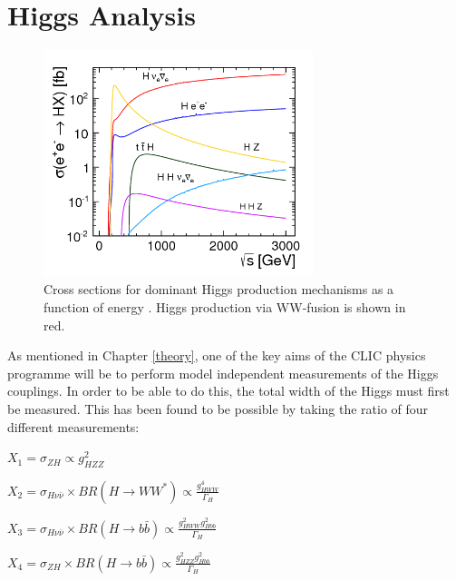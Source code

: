 \chapter{Higgs Analysis}
\label{Higgs Analysis}

\begin{figure}
  \centering
  \includegraphics[width=0.7\textwidth,keepaspectratio]{Theory/fig/HiggsCrossSections}
  \caption[Cross Sections For Higgs Production Mechanisms]{Cross sections for dominant Higgs production mechanisms as a function of energy \cite{Abramowicz:2016zbo}. Higgs production via WW-fusion is shown in red.}
  \label{fig:higgsXSecs2}
\end{figure}

As mentioned in Chapter \ref{theory}, one of the key aims of the \ac{CLIC} physics programme will be to perform model independent measurements of the Higgs couplings. In order to be able to do this, the total width of the Higgs must first be measured. This has been found to be possible by taking the ratio of four different measurements:


\hspace{120pt}  $X_1=\sigma_{ZH} \propto g_{HZZ}^2$

\hspace{120pt}   $X_2=\sigma_{H\nu\bar{\nu}} \times BR(H\rightarrow WW^*) \propto \frac{g_{HWW}^4}{\Gamma_H}$

\hspace{120pt}   $X_3=\sigma_{H\nu\bar{\nu}} \times BR(H\rightarrow b\bar{b}) \propto \frac{g_{HWW}^{2}g_{Hbb}^2}{\Gamma_H}$

\hspace{120pt}   $X_4=\sigma_{ZH} \times BR(H\rightarrow b\bar{b}) \propto \frac{g_{HZZ}^{2}g_{Hbb}^2}{\Gamma_H}$


